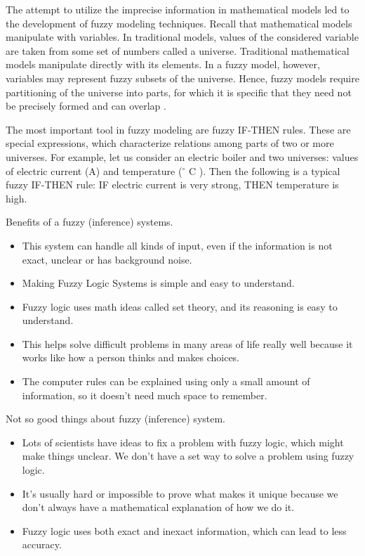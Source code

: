 The attempt to utilize the imprecise information in mathematical models led to the
development of fuzzy modeling techniques. Recall that mathematical models manipulate with variables. In traditional models, values of the considered variable are taken
from some set of numbers called a universe. Traditional mathematical models manipulate directly with its elements. In a fuzzy model, however, variables may represent
fuzzy subsets of the universe. Hence, fuzzy models require partitioning of the universe into parts, for which it is specific that they need not be precisely formed and
can overlap \cite{NOPEDV16}.

The most important tool in fuzzy modeling are fuzzy IF-THEN rules. These are
special expressions, which characterize relations among parts of two or more universes. For example, let us consider an electric boiler and two universes: values
of electric current (A) and temperature  (\(^\circ\)  C ). Then the following is a typical fuzzy IF-THEN rule: IF electric current is very strong, THEN temperature is high.

Benefits of a fuzzy (inference) systems.
\begin{itemize}
    \item This system can handle all kinds of input, even if the information is not exact, unclear or has background noise.
\item Making Fuzzy Logic Systems is simple and easy to understand.
\item Fuzzy logic uses math ideas called set theory, and its reasoning is easy to understand.
\item This helps solve difficult problems in many areas of life really well because it works like how a person thinks and makes choices.
\item The computer rules can be explained using only a small amount of information, so it doesn't need much space to remember.
\end{itemize}

Not so good things about fuzzy (inference) system.
\begin{itemize}
    \item Lots of scientists have ideas to fix a problem with fuzzy logic, which might make things unclear. We don't have a set way to solve a problem using fuzzy logic.
    \item It's usually hard or impossible to prove what makes it unique because we don't always have a mathematical explanation of how we do it.
\item Fuzzy logic uses both exact and inexact information, which can lead to less accuracy.
\end{itemize}

